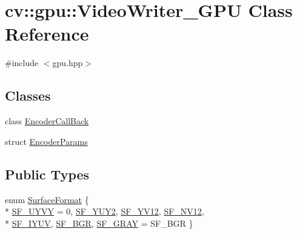 \hypertarget{classcv_1_1gpu_1_1VideoWriter__GPU}{\section{cv\-:\-:gpu\-:\-:Video\-Writer\-\_\-\-G\-P\-U Class Reference}
\label{classcv_1_1gpu_1_1VideoWriter__GPU}
}


{\ttfamily \#include $<$gpu.\-hpp$>$}

\subsection*{Classes}
\begin{DoxyCompactItemize}
\item 
class \hyperlink{classcv_1_1gpu_1_1VideoWriter__GPU_1_1EncoderCallBack}{Encoder\-Call\-Back}
\item 
struct \hyperlink{structcv_1_1gpu_1_1VideoWriter__GPU_1_1EncoderParams}{Encoder\-Params}
\end{DoxyCompactItemize}
\subsection*{Public Types}
\begin{DoxyCompactItemize}
\item 
enum \hyperlink{classcv_1_1gpu_1_1VideoWriter__GPU_ada559c518c52735d64366823e897e8db}{Surface\-Format} \{ \\*
\hyperlink{classcv_1_1gpu_1_1VideoWriter__GPU_ada559c518c52735d64366823e897e8dbae329e5e79a7d8abd3edc80d394e19f2c}{S\-F\-\_\-\-U\-Y\-V\-Y} = 0, 
\hyperlink{classcv_1_1gpu_1_1VideoWriter__GPU_ada559c518c52735d64366823e897e8dba0d795cdf8b11cf5df489d540bbe56d2a}{S\-F\-\_\-\-Y\-U\-Y2}, 
\hyperlink{classcv_1_1gpu_1_1VideoWriter__GPU_ada559c518c52735d64366823e897e8dba31c8f5c7259645357e4bca68a423ed96}{S\-F\-\_\-\-Y\-V12}, 
\hyperlink{classcv_1_1gpu_1_1VideoWriter__GPU_ada559c518c52735d64366823e897e8dba688d7ba26f43460820414360f1b053b6}{S\-F\-\_\-\-N\-V12}, 
\\*
\hyperlink{classcv_1_1gpu_1_1VideoWriter__GPU_ada559c518c52735d64366823e897e8dba933d1c20c20c3292cb6c29b25385c58d}{S\-F\-\_\-\-I\-Y\-U\-V}, 
\hyperlink{classcv_1_1gpu_1_1VideoWriter__GPU_ada559c518c52735d64366823e897e8dba7177ece8afd220ce60266029e5b12da8}{S\-F\-\_\-\-B\-G\-R}, 
\hyperlink{classcv_1_1gpu_1_1VideoWriter__GPU_ada559c518c52735d64366823e897e8dba32c4f628079f6b5c7eb97bd36395ff3b}{S\-F\-\_\-\-G\-R\-A\-Y} = S\-F\-\_\-\-B\-G\-R
 \}
\end{DoxyCompactItemize}
